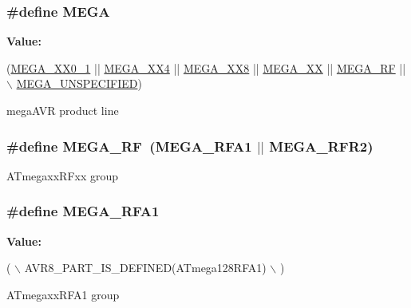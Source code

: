 \subsubsection[{M\+E\+G\+A}]{\setlength{\rightskip}{0pt plus 5cm}\#define M\+E\+G\+A}\label{group__mega__part__macros__group_ga78a6115b485de47c7cc56b224c558ea2}
{\bfseries Value\+:}
\begin{DoxyCode}
(\hyperlink{group__mega__part__macros__group_ga59ba73abcf65d3d398e7d37d78c271fe}{MEGA\_XX0\_1} || \hyperlink{group__mega__part__macros__group_gadcf5297df4d3d2f2bb5ccd7d6e3578b6}{MEGA\_XX4} || \hyperlink{group__mega__part__macros__group_ga47583caa82990781cd23a8495710ef31}{MEGA\_XX8} || \hyperlink{group__mega__part__macros__group_gabdf992a84b61d19055315a473c2e0f20}{MEGA\_XX} || 
      \hyperlink{group__mega__part__macros__group_ga1d762b037d9532cdfbc28404113aa480}{MEGA\_RF} || \hyperlink{group__mega__part__macros__group_gaabb3078f36ad4d875915bd54fa46f337}{\(\backslash\)}
\hyperlink{group__mega__part__macros__group_gaabb3078f36ad4d875915bd54fa46f337}{    MEGA\_UNSPECIFIED})
\end{DoxyCode}
mega\+A\+V\+R product line \hypertarget{group__mega__part__macros__group_ga1d762b037d9532cdfbc28404113aa480}{}
\subsubsection[{M\+E\+G\+A\+\_\+\+R\+F}]{\setlength{\rightskip}{0pt plus 5cm}\#define M\+E\+G\+A\+\_\+\+R\+F~({\bf M\+E\+G\+A\+\_\+\+R\+F\+A1} $\vert$$\vert$ {\bf M\+E\+G\+A\+\_\+\+R\+F\+R2})}\label{group__mega__part__macros__group_ga1d762b037d9532cdfbc28404113aa480}
A\+Tmegaxx\+R\+Fxx group \hypertarget{group__mega__part__macros__group_gaa301ab9851fc885a2d07f5df47d0a893}{}
\subsubsection[{M\+E\+G\+A\+\_\+\+R\+F\+A1}]{\setlength{\rightskip}{0pt plus 5cm}\#define M\+E\+G\+A\+\_\+\+R\+F\+A1}\label{group__mega__part__macros__group_gaa301ab9851fc885a2d07f5df47d0a893}
{\bfseries Value\+:}
\begin{DoxyCode}
( \(\backslash\)
        AVR8\_PART\_IS\_DEFINED(ATmega128RFA1) \(\backslash\)
        )
\end{DoxyCode}
A\+Tmegaxx\+R\+F\+A1 group \hypertarget{group__mega__part__macros__group_gaa5278eedfdfffaeb7c2c49aff7c2eb97}{}
